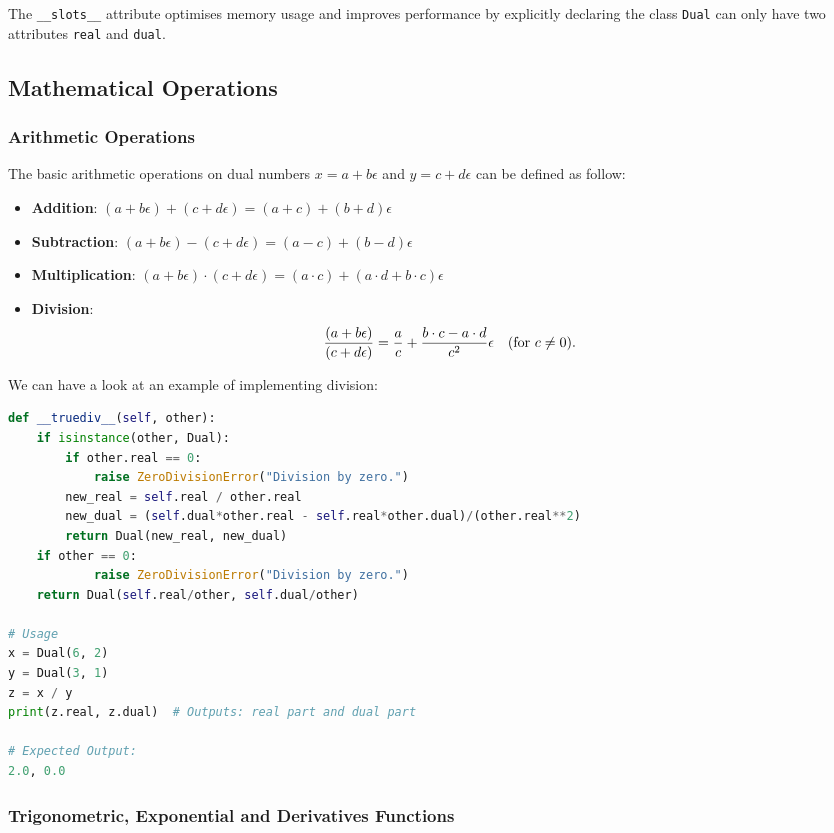 \documentclass[12.5pt]{article}
\begin{document}
The \texttt{\_\_slots\_\_} attribute optimises memory usage and improves performance by explicitly declaring the class \texttt{Dual} can only have two attributes \texttt{real} and \texttt{dual}. \cite{slot}


\subsection{Mathematical Operations}

\subsubsection{Arithmetic Operations}
The basic arithmetic operations on dual numbers \( x = a + b\epsilon \) and \( y = c + d\epsilon \) can be defined as follow:

\begin{itemize}
    \item \textbf{Addition}:
    \((a + b\epsilon) + (c + d\epsilon) = (a + c) + (b + d)\epsilon\)
    \item \textbf{Subtraction}:
    \((a + b\epsilon) - (c + d\epsilon) = (a - c) + (b - d)\epsilon\)
    \item \textbf{Multiplication}:
    \((a + b\epsilon) \cdot (c + d\epsilon) = (a \cdot c) + (a \cdot d + b \cdot c)\epsilon\)
    \item \textbf{Division}:
    \[
    \frac{(a + b\epsilon)}{(c + d\epsilon)} = \frac{a}{c} + \frac{b \cdot c - a \cdot d}{c^2}\epsilon \quad \text{(for \( c \neq 0 \))}.
    \]
\end{itemize}

We can have a look at an example of implementing division:
\begin{lstlisting}[language=Python]
def __truediv__(self, other):
    if isinstance(other, Dual):
        if other.real == 0:
            raise ZeroDivisionError("Division by zero.")
        new_real = self.real / other.real
        new_dual = (self.dual*other.real - self.real*other.dual)/(other.real**2)
        return Dual(new_real, new_dual)
    if other == 0:
            raise ZeroDivisionError("Division by zero.")
    return Dual(self.real/other, self.dual/other)

# Usage
x = Dual(6, 2)
y = Dual(3, 1)
z = x / y
print(z.real, z.dual)  # Outputs: real part and dual part

# Expected Output:
2.0, 0.0
\end{lstlisting}

\subsubsection{Trigonometric, Exponential and Derivatives Functions}
\end{document}
